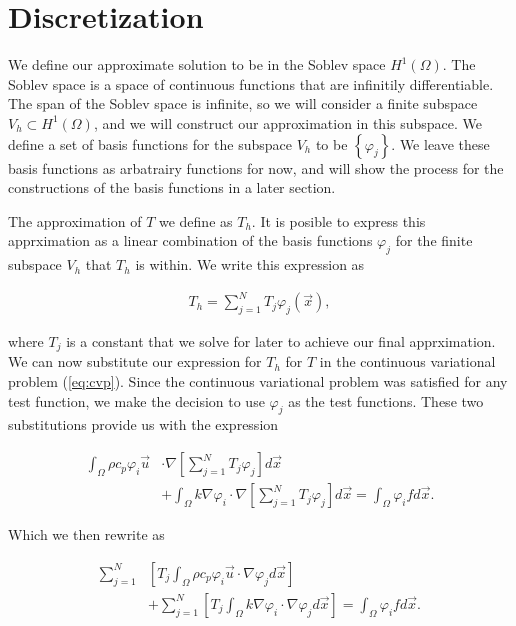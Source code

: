 \documentclass[../fem.tex]{subfiles}
\begin{document}
\section{Discretization}%
\label{sec:discretization}

We define our approximate solution to be in the Soblev space $H^1(\Omega)$. The
Soblev space is a space of continuous functions that are infinitily
differentiable. The span of the Soblev space is infinite, so we will consider a
finite subspace $V_h\subset H^1(\Omega)$, and we will construct our
approximation in this subspace. We define a set of basis functions for the
subspace $V_h$ to be $\left\{\varphi_j\right\}$. We leave these basis functions
as arbatrairy functions for now, and will show the process for the
constructions of the basis functions in a later section.

The approximation of $T$ we define as $T_h$. It is posible to express this
apprximation as a linear combination of the basis functions $\varphi_j$ for the
finite subspace $V_h$ that $T_h$ is within. We write this expression as

\begin{align}\label{eq:lin_approx}
  T_h=\sum_{j=1}^NT_j\varphi_j(\vec{x}),
\end{align}

where $T_j$ is a constant that we solve for later to achieve our final
apprximation. We can now substitute our expression for $T_h$ for $T$ in the
continuous variational problem (\ref{eq:cvp}). Since the continuous variational
problem was satisfied for any test function, we make the decision to use
$\varphi_j$ as the test functions. These two substitutions provide us with the
expression

\begin{align*}
  \int_\Omega\rho c_p \varphi_i\vec{u}&\cdot\nabla\left[\sum_{j=1}^NT_j\varphi_j\right]d\vec{x}\\
  &+\int_\Omega k\nabla
  \varphi_i\cdot\nabla\left[\sum_{j=1}^NT_j\varphi_j\right]d\vec{x}
  =\int_\Omega \varphi_ifd\vec{x}.
\end{align*}

Which we then rewrite as

\begin{align*}
  \sum_{j=1}^N&\left[T_j\int_\Omega\rho c_p\varphi_i\vec{u}\cdot\nabla\varphi_jd\vec{x}\right]\\
  &+ \sum_{j=1}^N\left[T_j\int_\Omega
  k\nabla\varphi_i\cdot\nabla\varphi_jd\vec{x}\right]=\int_\Omega\varphi_ifd\vec{x}.
\end{align*}
\end{document}
